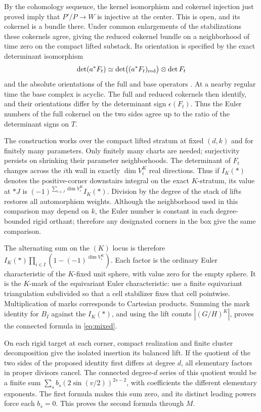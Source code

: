 By the cohomology sequence, the kernel isomorphism and cokernel
injection just proved imply that $P'/P\to W$ is injective at the
center. This is open, and its cokernel is a bundle there. Under common
enlargements of the stabilizations these cokernels agree, giving the
reduced cokernel bundle on a neighborhood of time zero on the compact
lifted substack. Its orientation is specified by the exact determinant
isomorphism
\[
       \det(a^*F_t)\simeq
       \det\bigl((a^*F_t)_{\rm red}\bigr)\otimes\det F_t
\]
and the absolute orientations of the full and base operators
\cite[(6.8)--(6.13)]{bai}. At a nearby regular time the base complex
is acyclic. The full and reduced cokernels then identify, and their
orientations differ by the determinant sign $\epsilon(F_t)$. Thus the
Euler numbers of the full cokernel on the two sides agree up to the
ratio of the determinant signs on $T$.


The construction works over the compact lifted stratum at fixed \((d,k)\)
and for finitely many parameters. Only finitely many charts are needed;
surjectivity persists on shrinking their parameter neighborhoods.
The determinant of \(F_t\) changes across the \(i\)th wall in exactly
\(\dim V_i^K\) real directions. Thus if \(I_K(*)\) denotes the positive-corner
downstairs integral on the exact \(K\)-stratum, its value at \(*J\) is
\((-1)^{\sum_{i\in J}\dim V_i^K}I_K(*)\). Division by the degree of the
stack of lifts restores all automorphism weights. Although the
neighborhood used in this comparison may depend on \(k\), the Euler number
is constant in each degree-bounded rigid orthant; therefore any
designated corners in the box give the same comparison.

The alternating sum on the \((K)\) locus is therefore \(I_K(*)\prod_{i\in I}(1-(-1)^{\dim V_i^K})\). Each factor is the ordinary Euler characteristic of the \(K\)-fixed unit sphere, with value zero for the empty sphere. It is the \(K\)-mark of the equivariant Euler characteristic: use a finite equivariant triangulation subdivided so that a cell stabilizer fixes that cell pointwise. Multiplication of marks corresponds to Cartesian products. Summing the mark identity for \(B_I\) against the \(I_K(*)\), and using the lift counts \(|(G/H)^K|\), proves the connected formula in \eqref{eq:mixed}.

On each rigid target at each corner, compact realization and finite cluster decomposition give the isolated insertion its balanced lift. If the quotient of the two sides of the proposed identity first differs at degree \(d\), all elementary factors in proper divisors cancel. The connected degree-\(d\) series of this quotient would be a finite sum \(\sum_s b_s(2\sin(v/2))^{2s-2}\), with coefficients the different elementary exponents. The first formula makes this sum zero, and its distinct leading powers force each \(b_s=0\). This proves the second formula through \(M\).


